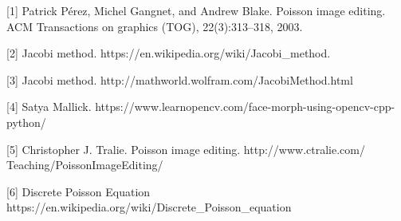 \documentclass[a4paper]{article}
\begin{document}
[1] Patrick Pérez, Michel Gangnet, and Andrew Blake. Poisson image editing. ACM Transactions on graphics (TOG), 22(3):313--318, 2003. 

[2] Jacobi method. https://en.wikipedia.org/wiki/Jacobi\_method. 

[3] Jacobi method. http://mathworld.wolfram.com/JacobiMethod.html 

[4] Satya Mallick. https://www.learnopencv.com/face-morph-using-opencv-cpp-python/ 

[5] Christopher J. Tralie. Poisson image editing. http://www.ctralie.com/ Teaching/PoissonImageEditing/ 

[6] Discrete Poisson Equation https://en.wikipedia.org/wiki/Discrete\_Poisson\_equation
\end{document}
